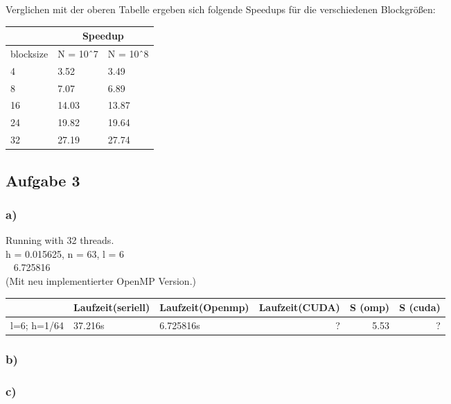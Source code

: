 \documentclass{article}
\begin{document}
Verglichen mit der oberen Tabelle ergeben sich folgende Speedups für die verschiedenen Blockgrößen: 
\begin{center}
	\begin{tabular}{l|l|l|}
		\cline{2-3}
		& \multicolumn{2}{c|}{Speedup} \\ \hline
		\multicolumn{1}{|l|}{blocksize} & N = 10ˆ7      & N = 10ˆ8     \\ \hline
		\multicolumn{1}{|l|}{4}         & 3.52          & 3.49         \\ \hline
		\multicolumn{1}{|l|}{8}         & 7.07          &       6.89       \\ \hline
		\multicolumn{1}{|l|}{16}        & 14.03         &       13.87       \\ \hline
		\multicolumn{1}{|l|}{24}        & 19.82         &     19.64         \\ \hline
		\multicolumn{1}{|l|}{32}        & 27.19         & 27.74        \\ \hline
	\end{tabular}
\end{center}

\subsection{Aufgabe 3}

\subsubsection{a)}

Running with 32 threads.\\
h = 0.015625, n = 63, l = 6\\
~ 6.725816\\

(Mit neu implementierter OpenMP Version.)

		\begin{tabular}{|l|l|l|r|r|r|}
	\hline
	&Laufzeit(seriell) &Laufzeit(Openmp)& Laufzeit(CUDA) & S (omp) & S (cuda)\\
	\hline
	l=6; h=1/64 & 37.216s & 6.725816s & ? & 5.53 & ? \\
	\hline
	
\end{tabular}

\subsubsection{b)}

\subsubsection{c)}
\end{document}
